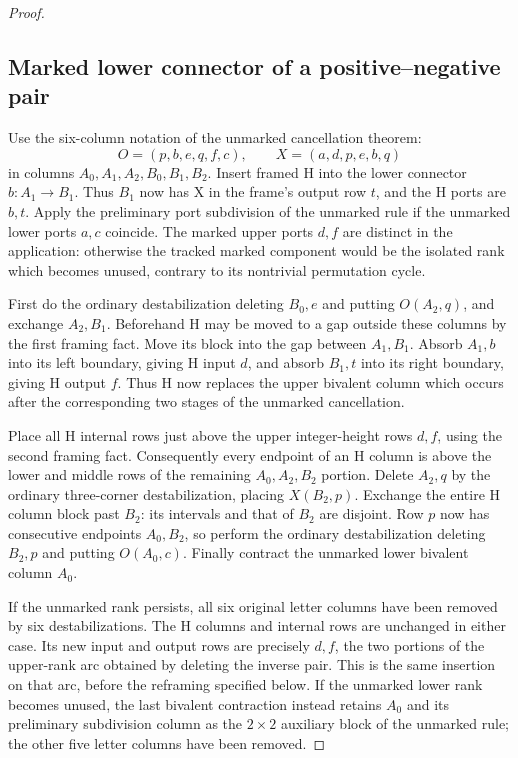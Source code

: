 \documentclass[11pt,a4paper]{article}
\theoremstyle{remark}
\begin{document}
\begin{proof}
\subsection{Marked lower connector of a positive--negative pair}

Use the six-column notation of the unmarked cancellation theorem:
\[
 O=(p,b,e,q,f,c),\qquad X=(a,d,p,e,b,q)
\]
in columns $A_0,A_1,A_2,B_0,B_1,B_2$.  Insert framed H into the lower
connector $b:A_1\to B_1$.  Thus $B_1$ now has X in the frame's output
row $t$, and the H ports are $b,t$.  Apply the preliminary port
subdivision of the unmarked rule if the unmarked lower ports $a,c$
coincide.  The marked upper ports $d,f$ are distinct in the application:
otherwise the tracked marked component would be the isolated rank
which becomes unused, contrary to its nontrivial permutation cycle.

First do the ordinary destabilization deleting $B_0,e$ and putting
$O(A_2,q)$, and exchange $A_2,B_1$.  Beforehand H may be moved to a
gap outside these columns by the first framing fact.  Move its block
into the gap between $A_1,B_1$.  Absorb $A_1,b$ into its left boundary,
giving H input $d$, and absorb $B_1,t$ into its right boundary, giving
H output $f$.  Thus H now replaces the upper bivalent column which
occurs after the corresponding two stages of the unmarked cancellation.

Place all H internal rows just above the upper integer-height rows
$d,f$, using the second framing fact.  Consequently every endpoint of
an H column is above the lower and middle rows of the remaining
$A_0,A_2,B_2$ portion.  Delete $A_2,q$ by the ordinary three-corner
destabilization, placing $X(B_2,p)$.  Exchange the entire H column block
past $B_2$: its intervals and that of $B_2$ are disjoint.  Row $p$ now
has consecutive endpoints $A_0,B_2$, so perform the ordinary
destabilization deleting $B_2,p$ and putting $O(A_0,c)$.  Finally
contract the unmarked lower bivalent column $A_0$.

If the unmarked rank persists, all six original letter columns have
been removed by six destabilizations.  The H columns and internal
rows are unchanged in either case.  Its
new input and output rows are precisely $d,f$, the two portions of the
upper-rank arc obtained by deleting the inverse pair.  This is the
same insertion on that arc, before the reframing specified below.
If the unmarked lower rank becomes unused, the last bivalent
contraction instead retains $A_0$ and its preliminary subdivision
column as the $2\times2$ auxiliary block of the unmarked rule; the
other five letter columns have been removed.


\end{proof}
\end{document}
